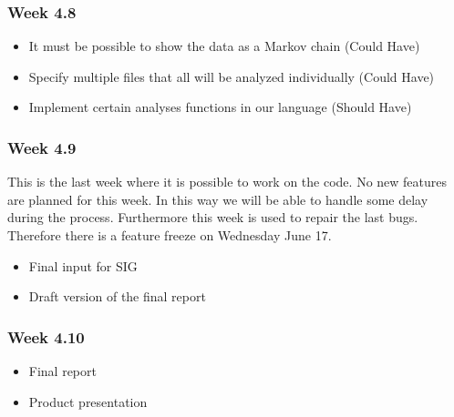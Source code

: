 \subsubsection{Week 4.8}
\begin{itemize}
	\item It must be possible to show the data as a Markov chain (Could Have)
	\item Specify multiple files that all will be analyzed individually (Could Have)
	\item Implement certain analyses functions in our language (Should Have)
\end{itemize}
\subsubsection{Week 4.9}
	This is the last week where it is possible to work on the code. No new features are planned for this week. In this way we will be able to handle some delay during the process. Furthermore this week is used to repair the last bugs. Therefore there is a feature freeze on Wednesday June 17. 
\begin{itemize}
	\item Final input for SIG
	\item Draft version of the final report
\end{itemize}
\subsubsection{Week 4.10}
\begin{itemize}
	\item Final report
	\item Product presentation
\end{itemize}